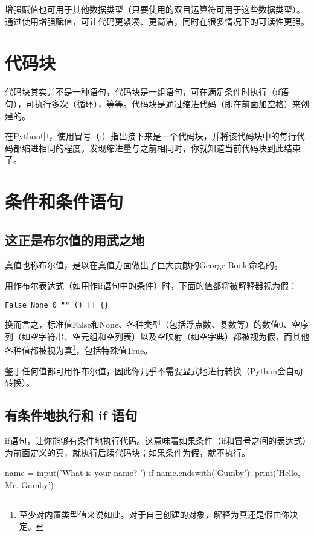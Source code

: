 增强赋值也可用于其他数据类型（只要使用的双目运算符可用于这些数据类型）。通过使用增强赋值，可让代码更紧凑、更简洁，同时在很多情况下的可读性更强。
\section{代码块}
代码块其实并不是一种语句，代码块是一组语句，可在满足条件时执行（if语句），可执行多次（循环），等等。代码块是通过缩进代码（即在前面加空格）来创建的。

在Python中，使用冒号（:）指出接下来是一个代码块，并将该代码块中的每行代码都缩进相同的程度。发现缩进量与之前相同时，你就知道当前代码块到此结束了。
\section{条件和条件语句}
\subsection{这正是布尔值的用武之地}
真值也称布尔值，是以在真值方面做出了巨大贡献的George Boole命名的。

用作布尔表达式（如用作if语句中的条件）时，下面的值都将被解释器视为假：

\verb|False None 0 "" () [] {}|

换而言之，标准值False和None、各种类型（包括浮点数、复数等）的数值0、空序列（如空字符串、空元组和空列表）以及空映射（如空字典）都被视为假，而其他各种值都被视为真\footnote{ 至少对内置类型值来说如此。对于自己创建的对象，解释为真还是假由你决定。}，包括特殊值True。

鉴于任何值都可用作布尔值，因此你几乎不需要显式地进行转换（Python会自动转换）。
\subsection{有条件地执行和 if 语句}
if语句，让你能够有条件地执行代码。这意味着如果条件（if和冒号之间的表达式）为前面定义的真，就执行后续代码块；如果条件为假，就不执行。
\begin{pyc}
name = input('What is your name? ')
if name.endswith('Gumby'):
    print('Hello, Mr. Gumby')
\end{pyc}
